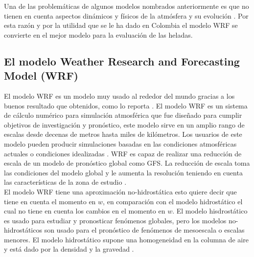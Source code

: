 \documentclass[11pt]{article}
\begin{document}

Una de las problemáticas de algunos modelos nombrados anteriormente es que no tienen en cuenta aspectos dinámicos y físicos de la atmósfera y su evolución \citep{Prabha2008a}. Por esta razón y por la utilidad que se le ha dado en Colombia el modelo WRF se convierte en el mejor modelo para la evaluación de las heladas.

\subsection{El modelo Weather Research and Forecasting Model (WRF)}

El modelo WRF es un modelo muy usado al rededor del mundo gracias a los buenos resultado que obtenidos, como lo reporta \citep{Jimenez2014}. El modelo WRF es un sistema de cálculo numérico para simulación atmosférica que fue diseñado para cumplir objetivos de investigación y pronóstico, este modelo sirve en un amplio rango de escalas desde decenas de metros hasta miles de kilómetros. Los usuarios de este modelo pueden producir simulaciones basadas en las condiciones atmosféricas actuales o condiciones idealizadas \citep{Pielke2002}. WRF es capaz de realizar una reducción de escala de un modelo de pronóstico global como GFS. La reducción de escala toma las condiciones del modelo global y le aumenta la resolución teniendo en cuenta las características de la zona de estudio \citep{Sene2010}.\\

El modelo WRF tiene una aproximación no-hidrostática esto quiere decir que tiene en cuenta el momento en $w$, en comparación con el modelo hidrostático el cual no tiene en cuenta los cambios en el momento en $w$. El modelo hisdrostático es usado para estudiar y pronosticar fenómenos globales, pero los modelos no-hidrostáticos son usado para el pronóstico de fenómenos de mesoescala o escalas menores. El modelo hidrostático supone una homogeneidad en la columna de aire y está dado por la densidad y la gravedad \citep{Pielke2002, Sene2010}.\\
\end{document}
